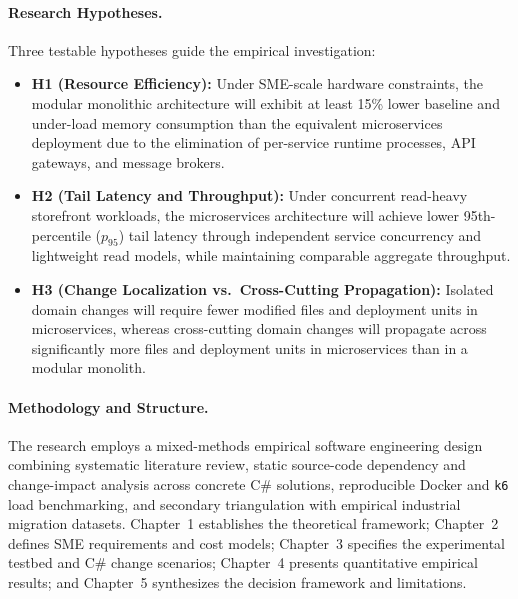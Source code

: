 \paragraph{Research Hypotheses.}
Three testable hypotheses guide the empirical investigation:
\begin{itemize}[leftmargin=1.5em]
  \item \textbf{H1 (Resource Efficiency):} Under SME-scale hardware constraints, the modular monolithic architecture will exhibit at least 15\% lower baseline and under-load memory consumption than the equivalent microservices deployment due to the elimination of per-service runtime processes, API gateways, and message brokers.
  \item \textbf{H2 (Tail Latency and Throughput):} Under concurrent read-heavy storefront workloads, the microservices architecture will achieve lower 95th-percentile ($p_{95}$) tail latency through independent service concurrency and lightweight read models, while maintaining comparable aggregate throughput.
  \item \textbf{H3 (Change Localization vs.\ Cross-Cutting Propagation):} Isolated domain changes will require fewer modified files and deployment units in microservices, whereas cross-cutting domain changes will propagate across significantly more files and deployment units in microservices than in a modular monolith.
\end{itemize}

\paragraph{Methodology and Structure.}
The research employs a mixed-methods empirical software engineering design combining systematic literature review, static source-code dependency and change-impact analysis across concrete C\# solutions, reproducible Docker and \texttt{k6} load benchmarking, and secondary triangulation with empirical industrial migration datasets. Chapter~1 establishes the theoretical framework; Chapter~2 defines SME requirements and cost models; Chapter~3 specifies the experimental testbed and C\# change scenarios; Chapter~4 presents quantitative empirical results; and Chapter~5 synthesizes the decision framework and limitations.
